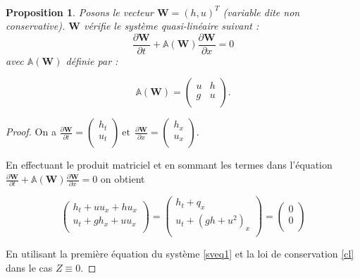 \documentclass[
11pt, %
francais, %
singlespacing, %
headsepline, %
]{MastersDoctoralThesis} %
\newtheorem{prop}{Proposition}
\theoremstyle{definition}
\begin{document}
\

\begin{prop}
Posons le vecteur $\textbf{W}= (h, u)^{T}$ (variable dite non conservative). $\textbf{W}$ vérifie le système quasi-linéaire suivant :
$$ \frac{\partial \textbf{W}}{\partial t} +\mathbb{A}(\textbf{W}) \frac{\partial\textbf{W}}{\partial x} = 0 \label{ql} $$
avec $\mathbb{A}(\textbf{W})$ définie par :

$$\mathbb{A}(\textbf{W}) =\begin{pmatrix}
   u & h  \\
   g & u  \\
\end{pmatrix}.$$

\end{prop}

\begin{proof}

On a $\frac{\partial\textbf{W}}{\partial t}=\begin{pmatrix}
   h_{t} \\
    u_{t} \\
\end{pmatrix} ~\text{et} ~~ \frac{\partial\textbf{W}}{\partial x}=\begin{pmatrix}
   h_{x} \\
    u_{x} \\
\end{pmatrix}$.

En effectuant le produit matriciel et en sommant les termes dans l'équation  $ \frac{\partial \textbf{W}}{\partial t} +\mathbb{A}(\textbf{W}) \frac{\partial\textbf{W}}{\partial x} = 0 \label{ql} $ on obtient

$$
\begin{pmatrix}
   h_{t} + uu_{x}+hu_{x}\\
    u_{t} + gh_{x}+uu_{x}\\
\end{pmatrix} = \begin{pmatrix}
h_{t} + q_{x} \\
u_{t} + (gh+u^{2})_{x}\\
\end{pmatrix} =
\begin{pmatrix}
0 \\
0\\
\end{pmatrix}
$$

En utilisant la première équation du système \eqref{sveq1} et la loi de conservation \eqref{cl} dans le cas $Z\equiv 0$.

\end{proof}
\end{document}
